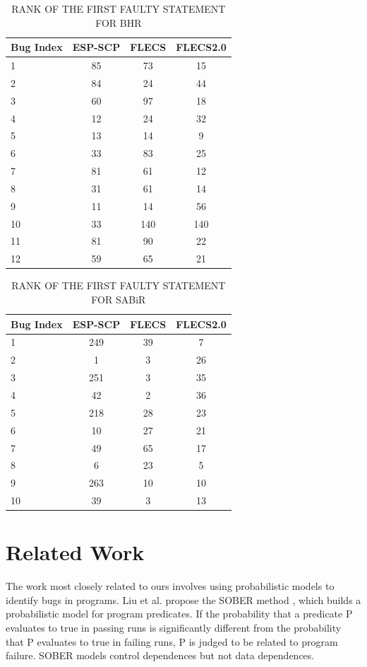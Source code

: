 \begin{table}[htbp!]
\centering
\caption{RANK OF THE FIRST FAULTY STATEMENT FOR BHR}
\label{flbhr}
      \begin{tabular}{|l|c|c|c|}
      \hline
Bug Index	&	ESP-SCP	&	FLECS	&	FLECS2.0	\\ \hline
1	&	85	&	73	&	15	\\ \hline
2	&	84	&	24	&	44	\\ \hline
3	&	60	&	97	&	18	\\ \hline
4	&	12	&	24	&	32	\\ \hline
5	&	13	&	14	&	9	\\ \hline
6	&	33	&	83	&	25	\\ \hline
7	&	81	&	61	&	12	\\ \hline
8	&	31	&	61	&	14	\\ \hline
9	&	11	&	14	&	56	\\ \hline
10	&	33	&	140	&	140  \\ \hline
11	&	81	&	90	&	22	\\ \hline
12	&	59	&	65	&	21	\\ \hline
\end{tabular}
\end{table}

\begin{table}[htbp!]
\centering
\caption{RANK OF THE FIRST FAULTY STATEMENT FOR SABiR}
\label{flsabir}
      \begin{tabular}{|l|c|c|c|}
      \hline
Bug Index	&	ESP-SCP	&	FLECS	&	FLECS2.0	\\ \hline
1	&	249	&	39	&	7	\\ \hline
2	&	1	&	3	&	26	\\ \hline
3	&	251	&	3	&	35	\\ \hline
4	&	42	&	2	&	36	\\ \hline
5	&	218	&	28	&	23	\\ \hline
6	&	10	&	27	&	21	\\ \hline
7	&	49	&	65	&	17	\\ \hline
8	&	6	&	23	&	5	\\ \hline
9	&	263	&	10	&	10	\\ \hline
10	&	39	&	3	&	13	\\ \hline
\end{tabular}
\end{table}

\section{Related Work}
The work most closely related to ours involves using probabilistic models to identify bugs in programs. Liu et al. propose the SOBER method \cite{liu2006statistical}, which builds a probabilistic model for program predicates. If the probability that a predicate P evaluates to true in passing runs is significantly different from the probability that P evaluates to true in failing runs, P is judged to be related to program failure. SOBER models control dependences but not data dependences. 

